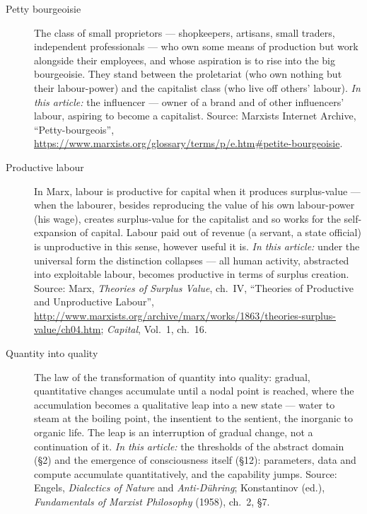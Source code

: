 \documentclass[11pt]{article}
\begin{document}
\begin{description}
\item[Petty bourgeoisie] The class of small proprietors --- shopkeepers,
artisans, small traders, independent professionals --- who own some
means of production but work alongside their employees, and whose
aspiration is to rise into the big bourgeoisie. They stand between the
proletariat (who own nothing but their labour-power) and the capitalist
class (who live off others' labour). \emph{In this article:} the
influencer --- owner of a brand and of other influencers' labour,
aspiring to become a capitalist. Source: Marxists Internet Archive,
``Petty-bourgeois'',
\url{https://www.marxists.org/glossary/terms/p/e.htm#petite-bourgeoisie}.

\item[Productive labour] In Marx, labour is productive for capital when
it produces surplus-value --- when the labourer, besides reproducing
the value of his own labour-power (his wage), creates surplus-value for
the capitalist and so works for the self-expansion of capital. Labour
paid out of revenue (a servant, a state official) is unproductive in
this sense, however useful it is. \emph{In this article:} under the
universal form the distinction collapses --- all human activity,
abstracted into exploitable labour, becomes productive in terms of
surplus creation. Source: Marx, \textit{Theories of Surplus Value},
ch.~IV, ``Theories of Productive and Unproductive Labour'',
\url{http://www.marxists.org/archive/marx/works/1863/theories-surplus-value/ch04.htm};
\textit{Capital}, Vol.~1, ch.~16.

\item[Quantity into quality] The law of the transformation of quantity
into quality: gradual, quantitative changes accumulate until a nodal
point is reached, where the accumulation becomes a qualitative leap into
a new state --- water to steam at the boiling point, the insentient to
the sentient, the inorganic to organic life. The leap is an interruption
of gradual change, not a continuation of it. \emph{In this article:}
the thresholds of the abstract domain (§2) and the emergence of
consciousness itself (§12): parameters, data and compute accumulate
quantitatively, and the capability jumps. Source: Engels,
\textit{Dialectics of Nature} and \textit{Anti-Dühring}; Konstantinov
(ed.), \textit{Fundamentals of Marxist Philosophy} (1958), ch.~2, §7.


\end{description}
\end{document}
